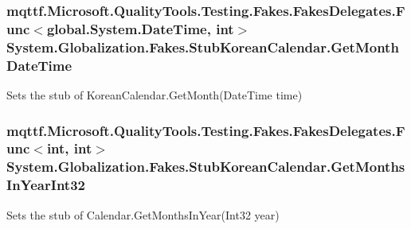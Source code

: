 \hypertarget{class_system_1_1_globalization_1_1_fakes_1_1_stub_korean_calendar_a57aa8c9bd31a1f10a0b6b30f861277d2}{
\subsubsection[{Get\-Month\-Date\-Time}]{\setlength{\rightskip}{0pt plus 5cm}mqttf.\-Microsoft.\-Quality\-Tools.\-Testing.\-Fakes.\-Fakes\-Delegates.\-Func$<$global.\-System.\-Date\-Time, int$>$ System.\-Globalization.\-Fakes.\-Stub\-Korean\-Calendar.\-Get\-Month\-Date\-Time}}\label{class_system_1_1_globalization_1_1_fakes_1_1_stub_korean_calendar_a57aa8c9bd31a1f10a0b6b30f861277d2}


Sets the stub of Korean\-Calendar.\-Get\-Month(\-Date\-Time time)

\hypertarget{class_system_1_1_globalization_1_1_fakes_1_1_stub_korean_calendar_abad62e1a11e751db14357b09ed73500a}{
\subsubsection[{Get\-Months\-In\-Year\-Int32}]{\setlength{\rightskip}{0pt plus 5cm}mqttf.\-Microsoft.\-Quality\-Tools.\-Testing.\-Fakes.\-Fakes\-Delegates.\-Func$<$int, int$>$ System.\-Globalization.\-Fakes.\-Stub\-Korean\-Calendar.\-Get\-Months\-In\-Year\-Int32}}\label{class_system_1_1_globalization_1_1_fakes_1_1_stub_korean_calendar_abad62e1a11e751db14357b09ed73500a}


Sets the stub of Calendar.\-Get\-Months\-In\-Year(\-Int32 year)

